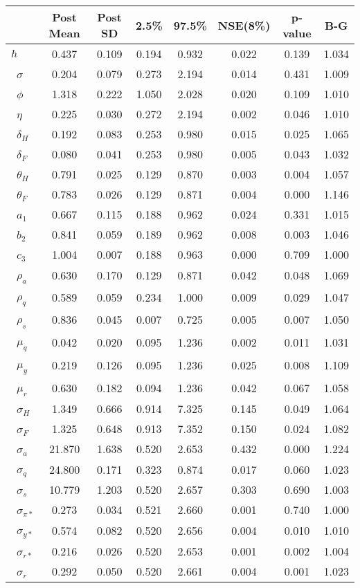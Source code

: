 \begin{tiny}\begin{tabular}{lccccccc}
\hline
&\textbf{Post Mean}&\textbf{Post SD}&\textbf{2.5\%}&\textbf{97.5\%}&\textbf{NSE(8\%)}&\textbf{p-value}&\textbf{B-G}\\\hline
\textbf{$ h             $}&0.437&0.109&0.194&0.932&0.022&0.139&1.034\\\
\textbf{$ \sigma        $}&0.204&0.079&0.273&2.194&0.014&0.431&1.009\\\
\textbf{$ \phi          $}&1.318&0.222&1.050&2.028&0.020&0.109&1.010\\\
\textbf{$ \eta          $}&0.225&0.030&0.272&2.194&0.002&0.046&1.010\\\
\textbf{$ \delta_{H}    $}&0.192&0.083&0.253&0.980&0.015&0.025&1.065\\\
\textbf{$ \delta_{F}    $}&0.080&0.041&0.253&0.980&0.005&0.043&1.032\\\
\textbf{$ \theta_{H}    $}&0.791&0.025&0.129&0.870&0.003&0.004&1.057\\\
\textbf{$ \theta_{F}    $}&0.783&0.026&0.129&0.871&0.004&0.000&1.146\\\
\textbf{$ a_{1}         $}&0.667&0.115&0.188&0.962&0.024&0.331&1.015\\\
\textbf{$ b_{2}         $}&0.841&0.059&0.189&0.962&0.008&0.003&1.046\\\
\textbf{$ c_{3}         $}&1.004&0.007&0.188&0.963&0.000&0.709&1.000\\\
\textbf{$ \rho_{a}      $}&0.630&0.170&0.129&0.871&0.042&0.048&1.069\\\
\textbf{$ \rho_{q}      $}&0.589&0.059&0.234&1.000&0.009&0.029&1.047\\\
\textbf{$ \rho_{s}      $}&0.836&0.045&0.007&0.725&0.005&0.007&1.050\\\
\textbf{$ \mu_{q}       $}&0.042&0.020&0.095&1.236&0.002&0.011&1.031\\\
\textbf{$ \mu_{y}       $}&0.219&0.126&0.095&1.236&0.025&0.008&1.109\\\
\textbf{$ \mu_{r}       $}&0.630&0.182&0.094&1.236&0.042&0.067&1.058\\\
\textbf{$ \sigma_{H}    $}&1.349&0.666&0.914&7.325&0.145&0.049&1.064\\\
\textbf{$ \sigma_{F}    $}&1.325&0.648&0.913&7.352&0.150&0.024&1.082\\\
\textbf{$ \sigma_{a}    $}&21.870&1.638&0.520&2.653&0.432&0.000&1.224\\\
\textbf{$ \sigma_{q}    $}&24.800&0.171&0.323&0.874&0.017&0.060&1.023\\\
\textbf{$ \sigma_{s}    $}&10.779&1.203&0.520&2.657&0.303&0.690&1.003\\\
\textbf{$ \sigma_{\pi*} $}&0.273&0.034&0.521&2.660&0.001&0.740&1.000\\\
\textbf{$ \sigma_{y*}   $}&0.574&0.082&0.520&2.656&0.004&0.010&1.010\\\
\textbf{$ \sigma_{r*}   $}&0.216&0.026&0.520&2.653&0.001&0.002&1.004\\\
\textbf{$ \sigma_{r}    $}&0.292&0.050&0.520&2.661&0.004&0.001&1.023\\\hline
\end{tabular}
\end{tiny}